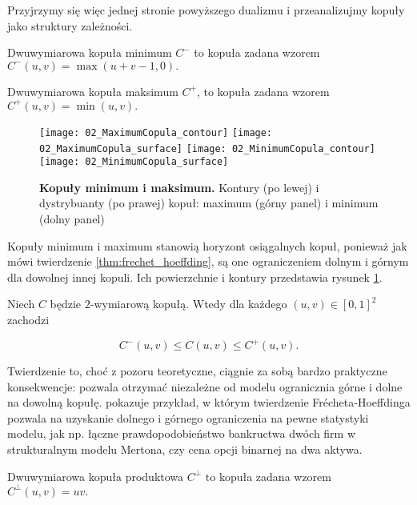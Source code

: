 Przyjrzymy się więc jednej stronie powyższego dualizmu i przeanalizujmy kopuły jako struktury zależności.

\begin{df}
	Dwuwymiarowa kopuła minimum $C^{-}$ to kopuła zadana wzorem $C^{-}(u, v) = \max(u+v-1, 0).$
\end{df}
\begin{df}
	Dwuwymiarowa kopuła maksimum $C^{+}$, to kopuła zadana wzorem $C^{+}(u, v) = \min(u, v).$
\end{df}

\begin{figure}[h]
	\centering
	\texttt{[image: 02\_MaximumCopula\_contour]}
	\texttt{[image: 02\_MaximumCopula\_surface]}
	\texttt{[image: 02\_MinimumCopula\_contour]}
	\texttt{[image: 02\_MinimumCopula\_surface]}
	
	\caption{\textbf{Kopuły minimum i maksimum.} Kontury (po lewej) i dystrybuanty (po prawej) kopuł: maximum (górny panel) i minimum (dolny panel)\label{fig:minmax_copula}}
\end{figure}

Kopuły minimum i maximum stanowią horyzont osiągalnych kopuł, ponieważ jak mówi twierdzenie \ref{thm:frechet_hoeffding}, są one ograniczeniem dolnym i górnym dla dowolnej innej kopuli. Ich powierzchnie i kontury przedstawia rysunek \ref{fig:minmax_copula}. 

\begin{thm}
	Niech $C$ będzie $2$-wymiarową kopułą. Wtedy dla każdego $(u, v)\in[0, 1]^2$ zachodzi
	
	$$ C^{-}(u, v) \leqslant C(u, v) \leqslant C^{+}(u, v).$$
	
	\label{thm:frechet_hoeffding}
\end{thm}

Twierdzenie to, choć z pozoru teoretyczne, ciągnie za sobą bardzo praktyczne konsekwencje: pozwala otrzymać niezależne od modelu ogranicznia górne i dolne na dowolną kopułę. \cite{Cherubini_Copula_Methods_in_Finance} pokazuje przykład, w którym twierdzenie \newline Frécheta-Hoeffdinga pozwala na uzyskanie dolnego i górnego ograniczenia na pewne statystyki modelu, jak np. łączne prawdopodobieństwo bankructwa dwóch firm w strukturalnym modelu Mertona, czy cena opcji binarnej na dwa aktywa.\\

\begin{df}
	Dwuwymiarowa kopuła produktowa $C^{\perp}$ to kopuła zadana wzorem $C^{\perp}(u, v) = uv.$
\end{df}


